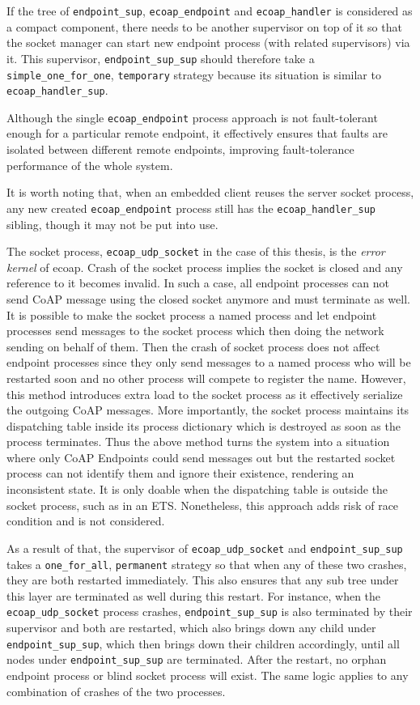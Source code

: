 If the tree of \verb|endpoint_sup|, \verb|ecoap_endpoint| and \verb|ecoap_handler| is considered as a compact component, there needs to be another supervisor on top of it so that the socket manager can start new endpoint process (with related supervisors) via it. This supervisor, \verb|endpoint_sup_sup| should therefore take a \verb|simple_one_for_one|, \verb|temporary| strategy because its situation is similar to \verb|ecoap_handler_sup|. 

Although the single \verb|ecoap_endpoint| process approach is not fault-tolerant enough for a particular remote endpoint, it effectively ensures that faults are isolated between different remote endpoints, improving fault-tolerance performance of the whole system. 

It is worth noting that, when an embedded client reuses the server socket process, any new created \verb|ecoap_endpoint| process still has the \verb|ecoap_handler_sup| sibling, though it may not be put into use. 

The socket process, \verb|ecoap_udp_socket| in the case of this thesis, is the \textit{error kernel} of ecoap. Crash of the socket process implies the socket is closed and any reference to it becomes invalid. In such a case, all endpoint processes can not send CoAP message using the closed socket anymore and must terminate as well. It is possible to make the socket process a named process and let endpoint processes send messages to the socket process which then doing the network sending on behalf of them. Then the crash of socket process does not affect endpoint processes since they only send messages to a named process who will be restarted soon and no other process will compete to register the name. However, this method introduces extra load to the socket process as it effectively serialize the outgoing CoAP messages. More importantly, the socket process maintains its dispatching table inside its process dictionary which is destroyed as soon as the process terminates. Thus the above method turns the system into a situation where only CoAP Endpoints could send messages out but the restarted socket process can not identify them and ignore their existence, rendering an inconsistent state. It is only doable when the dispatching table is outside the socket process, such as in an ETS. Nonetheless, this approach adds risk of race condition and is not considered. 

As a result of that, the supervisor of \verb|ecoap_udp_socket| and \verb|endpoint_sup_sup| takes a \verb|one_for_all|, \verb|permanent| strategy so that when any of these two crashes, they are both restarted immediately. This also ensures that any sub tree under this layer are terminated as well during this restart. For instance, when the \verb|ecoap_udp_socket| process crashes, \verb|endpoint_sup_sup| is also terminated by their supervisor and both are restarted, which also brings down any child under \verb|endpoint_sup_sup|, which then brings down their children accordingly, until all nodes under \verb|endpoint_sup_sup| are terminated. After the restart, no orphan endpoint process or blind socket process will exist. The same logic applies to any combination of crashes of the two processes. 

